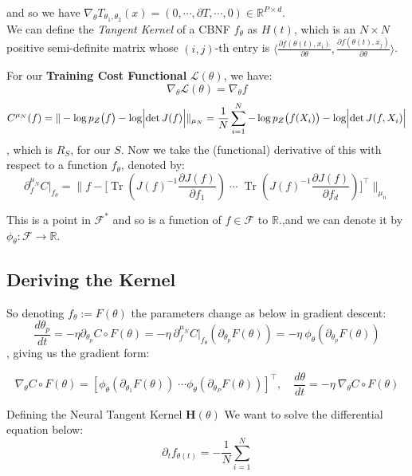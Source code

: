 \documentclass[11pt, a4paper]{article}
\theoremstyle{definition}
\theoremstyle{remark}
\newcommand{\R}{\mathbb{R}}
\newcommand{\empnorm}[1]{\|#1\|_{\mu_n}}
\newcommand{\inner}[2]{\langle #1 , #2 \rangle }
\newcommand{\tr}{\operatorname{Tr}}
\newcommand{\bH}{\mathbf{H}}
\begin{document}
	and so we have
	\(
	\nabla_\theta T_{\theta_1,\theta_2}(x) = (
		0 ,
		\cdots ,
		\partial T ,
		\cdots,
		0
) \in \R^{P \times d}
	\).\\
	

	
	We can define the \textit{Tangent Kernel} of a CBNF \(f_\theta\) as \(H(t)\), which is an \(N\times N\) positive semi-definite matrix whose \((i,j)\)-th entry is \(\inner{\frac{\partial f(\theta(t),x_i)}{\partial \theta}}{\frac{\partial f(\theta(t),x_j)}{\partial \theta}}\).
	
	
	
	
	For our \textbf{Training Cost Functional} \(\mathcal{L}(\theta)\), we have:
	\[
	\nabla_\theta \mathcal{L}(\theta) = \nabla_\theta f
	\]
	\[
	C^{\mu_N}(f) = \| -\log p_Z\bigl(f \bigr) - \log \Bigl|\det J(f) \Bigr| \|_{\mu_N} =\frac{1}{N} \sum_{i=1}^{N}  -\log p_Z\bigl(f(X_i)\bigr) - \log \Bigl|\det J(f,X_i)\Bigr|
	\]
	, which is \(\hat{R}_S\), for our \(S\).
	Now we take the (functional) derivative of this with respect to a function \(f_\theta\), denoted by:
	\[
	\partial^{\mu_N}_{f} C\bigr|_{f_\theta} = \empnorm{ 
		f - \bigl[ \tr\left( J(f)^{-1} \frac{\partial J(f)}{\partial f_1} \right) \; \cdots \; \tr\left( J(f)^{-1} \frac{\partial J(f)}{\partial f_d} \right) \bigr]^\top
	}  
	\]
	
		This is a point in \(\mathcal{F}^*\) and so is a function of \(f \in \mathcal{F}\) to \(\R\).,and we can denote it by \(\phi_\theta:\mathcal{F}\to \R\).
	
	\subsection{Deriving the Kernel}
	So denoting \(f_\theta := F(\theta)\) the parameters change as below in gradient descent:
	\[
	\frac{d \theta_p}{dt} =  - \eta \partial_{\theta_p} C\circ F(\theta) = -\eta \ \partial^{\mu_N}_{f}C\bigr|_{f_\theta} (\partial_{\theta_p} F(\theta))  = 
- \eta \ \phi_\theta (\partial_{\theta_p} F(\theta))
	\]
, giving us the gradient form:

 \[\nabla_\theta C\circ F(\theta)  = [ \phi_\theta(\partial_{\theta_1}F(\theta)) \; \cdots \phi_\theta(\partial_{\theta_P}F(\theta)) ]^\top 
 ,\quad
 \frac{d \theta}{d t} = - \eta \ \nabla_\theta C\circ F(\theta)
 \]

Defining the Neural Tangent Kernel \(\bH(\theta)\)
We want to solve the differential equation below:
\[
\partial_{t} f_{\theta(t)} = - \frac{1}{N} \sum_{i=1}^{N} 
\]
\end{document}
